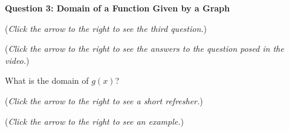 \documentclass{ximera}
\begin{document}
\textbf{Question 3: Domain of a Function Given by a Graph}
\begin{question}
\begin{flushright}
{\color{blue}(\emph{Click the arrow to the right to see the third question.})}
\end{flushright}
\begin{center}
\begin{expandable}
{\color{blue}(\emph{Click the arrow to the right to see the answers 
to the question posed in the video.})}
\begin{expandable}
What is the domain of $g(x)$?
\begin{multipleChoice}
\choice[correct]{$[-1,1)\cup(1,3]\cup[4,6]$}
\choice{$[-1,3]\cup[4,6]$}
\choice{$\{2\} \cup [6,15)$}
\choice{$\{2\}\cup [9,15)$}
\choice{$\{2\} \cup [6,9)$}
\end{multipleChoice}
\begin{flushright}
{\color{blue}(\emph{Click the arrow to the right to see a short refresher.})}
\end{flushright}
\begin{expandable}
\end{expandable}
\begin{flushright}
{\color{blue}(\emph{Click the arrow to the right to see an example.})}
\end{flushright}
\begin{expandable}
\end{expandable}
\end{expandable}
\end{expandable}
\end{center}
\end{question}
\end{document}
